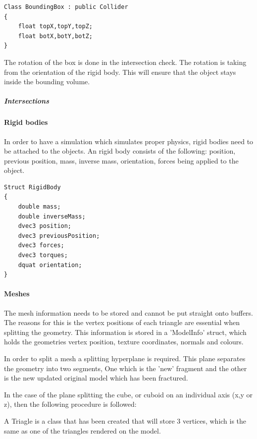 \documentclass[conference,backref=page]{acmsiggraph}
\begin{document}
\begin{lstlisting}
Class BoundingBox : public Collider
{
	float topX,topY,topZ;
	float botX,botY,botZ;
}
\end{lstlisting}

The rotation of the box is done in the intersection check. The rotation is taking from the orientation of the rigid body. This will ensure that the object stays inside the bounding volume.
\subparagraph{Intersections}


\paragraph{Rigid bodies} \hfill

In order to have a simulation which simulates proper physics, rigid bodies need to be attached to the objects. An rigid body consists of the following: position, previous position, mass, inverse mass, orientation, forces being applied to the object. 
\begin{lstlisting}
Struct RigidBody
{
	double mass;
	double inverseMass;
	dvec3 position;
	dvec3 previousPosition;
	dvec3 forces;
	dvec3 torques;
	dquat orientation;
}

\end{lstlisting}



\paragraph{Meshes} \hfill

The mesh information needs to be stored and cannot be put straight onto buffers. The reasons for this is the vertex positions of each triangle are essential when splitting the geometry. This information is stored in a 'ModelInfo' struct, which holds the geometries vertex position, texture coordinates, normals and colours.
 
In order to split a mesh a splitting hyperplane is required. This plane separates the geometry into two segments, One which is the 'new' fragment and the other is the new updated original model which has been fractured. 

In the case of the plane splitting the cube, or cuboid on an individual axis (x,y or z), then the following procedure is followed:

A Triagle is a class that has been created that will store 3 vertices, which is the same as one of the triangles rendered on the model.
\end{document}
